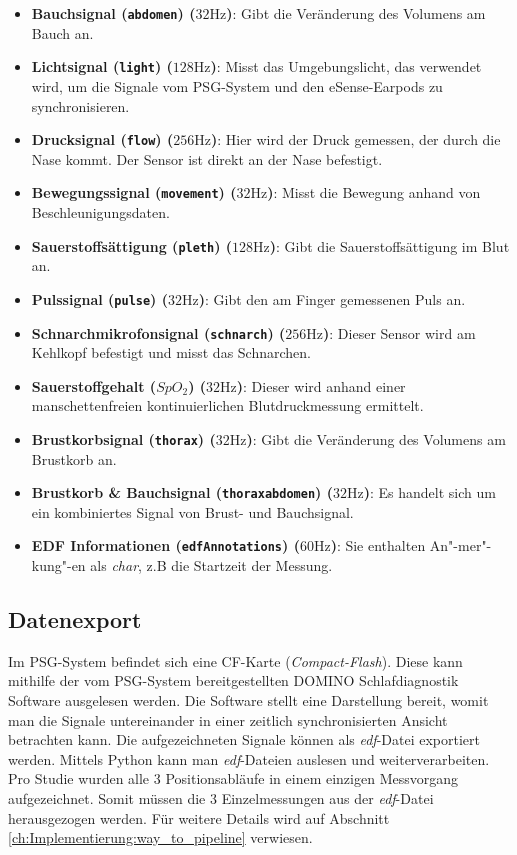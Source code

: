 \begin{itemize}
    \item \textbf{Bauchsignal (\texttt{abdomen}) ($32 \si{\hertz}$)}: Gibt die Veränderung des Volumens am Bauch an.
    \item \textbf{Lichtsignal (\texttt{light}) ($128 \si{\hertz}$)}: Misst das Umgebungslicht, das verwendet wird, um die Signale vom PSG-System und den eSense-Earpods zu synchronisieren.
    \item \textbf{Drucksignal (\texttt{flow}) ($256 \si{\hertz}$)}: Hier wird der Druck gemessen, der durch die Nase kommt. Der Sensor ist direkt an der Nase befestigt.
    \item \textbf{Bewegungssignal (\texttt{movement}) ($32 \si{\hertz}$)}: Misst die Bewegung anhand von Beschleunigungsdaten.
    \item \textbf{Sauerstoffsättigung (\texttt{pleth}) ($128 \si{\hertz}$)}: Gibt die Sauerstoffsättigung im Blut an.
    \item \textbf{Pulssignal (\texttt{pulse}) ($32 \si{\hertz}$)}: Gibt den am Finger gemessenen Puls an.
    \item \textbf{Schnarchmikrofonsignal (\texttt{schnarch}) ($256 \si{\hertz}$)}: Dieser Sensor wird am Kehlkopf befestigt und misst das Schnarchen.
    \item \textbf{Sauerstoffgehalt (\texttt{$SpO_2$}) ($32 \si{\hertz}$)}: Dieser wird anhand einer manschettenfreien kontinuierlichen Blutdruckmessung ermittelt.
    \item \textbf{Brustkorbsignal (\texttt{thorax}) ($32 \si{\hertz}$)}: Gibt die Veränderung des Volumens am Brustkorb an.
    \item \textbf{Brustkorb \& Bauchsignal (\texttt{thoraxabdomen}) ($32 \si{\hertz}$)}: Es handelt sich um ein kombiniertes Signal von Brust- und Bauchsignal.
    \item \textbf{EDF Informationen (\texttt{edfAnnotations}) ($60 \si{\hertz}$)}: Sie enthalten An"-mer"-kung"-en als \textit{char}, z.B die Startzeit der Messung.
\end{itemize}

\subsection{Datenexport}
\label{ch:sa:psg:export}

Im PSG-System befindet sich eine CF-Karte (\textit{Compact-Flash}). Diese kann mithilfe der vom PSG-System bereitgestellten {\glqq DOMINO Schlafdiagnostik\grqq} Software ausgelesen werden.
Die Software stellt eine Darstellung bereit, womit man die Signale untereinander in einer zeitlich synchronisierten Ansicht betrachten kann. Die aufgezeichneten Signale können als \textit{edf}-Datei exportiert werden.
Mittels Python kann man \textit{edf}-Dateien auslesen und weiterverarbeiten.
Pro Studie wurden alle 3 Positionsabläufe in einem einzigen Messvorgang aufgezeichnet. Somit müssen die 3 Einzelmessungen aus der \textit{edf}-Datei herausgezogen werden.
Für weitere Details wird auf Abschnitt \ref{ch:Implementierung:way_to_pipeline} verwiesen.

